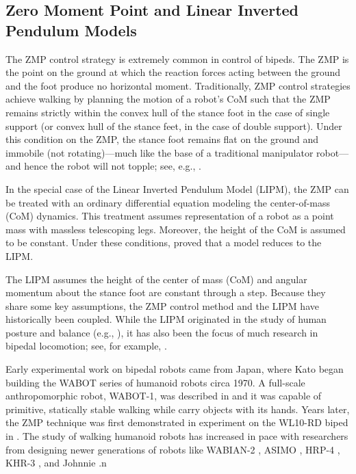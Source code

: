 \subsection{Zero Moment Point and Linear Inverted Pendulum Models}

The ZMP control strategy \cite{Vukobratovic2004, Vukobratovic1990} is extremely
common in control of bipeds.
%
The ZMP is the point on the ground at which the reaction forces acting between
the ground and the foot produce no horizontal moment.
%
Traditionally, ZMP control strategies achieve walking by planning the motion of
a robot's CoM such that the ZMP remains strictly within the convex hull of the
stance foot in the case of single support (or convex hull of the stance feet, in
the case of double support).
%
Under this condition on the ZMP, the stance foot remains flat on the ground and
immobile (not rotating)---much like the base of a traditional manipulator
robot---and hence the robot will not topple; see, e.g., \cite{Yamaguchi1999}.

In the special case of the Linear Inverted Pendulum Model (LIPM),
%
%
the ZMP can be treated with an ordinary differential equation modeling the
center-of-mass (CoM) dynamics.
%
This treatment assumes representation of a robot as a point mass with massless telescoping legs.
%
Moreover, the height of the CoM is assumed to be constant.
%
Under these conditions, \cite{Kajita1991} proved that a model reduces to the LIPM.
%

The LIPM assumes the height of the center of mass (CoM) and angular momentum
about the stance foot are constant through a step.
%
Because they share some key assumptions, the ZMP control method and the LIPM
have historically been coupled.
%
While the LIPM originated in the study of human posture and balance (e.g.,
\cite{Geursen1976, Winter1995, Patton1999}), it has also been the focus of much
research in bipedal locomotion; see, for example, \cite{Miura1984, Kajita2001,
  Kajita2010}.
%



Early experimental work on bipedal robots came from Japan, where Kato began
building the WABOT series of humanoid robots circa 1970.
%
A full-scale anthropomorphic robot, WABOT-1, was described in \cite{Kato1974} and
it was capable of primitive, statically stable walking while carry objects with
its hands.
%
Years later, the ZMP technique was first demonstrated in experiment on the
WL10-RD biped in \cite{Takanishi1985}.
%
The study of walking humanoid robots has increased in pace with researchers from
designing newer generations of robots like WABIAN-2 \cite{Ogura2006}, ASIMO
\cite{Sakagami2002}, HRP-4 \cite{Kaneko2011}, KHR-3 \cite{Park2005}, and Johnnie
\cite{Pfeiffer2002}.n


